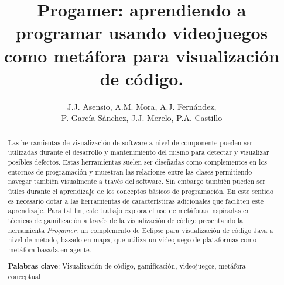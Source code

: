 \documentclass{llncs}
\begin{document}

\title{Progamer: aprendiendo a programar usando videojuegos como metáfora para visualización de código.}


\author{J.J. Asensio, A.M. Mora, A.J. Fernández, \\P. García-Sánchez, J.J. Merelo, P.A. Castillo}

\maketitle
%
%
\begin{abstract} 
Las herramientas de visualización de software a nivel de componente
pueden ser utilizadas durante el desarrollo y mantenimiento del mismo
para detectar y visualizar posibles defectos. Estas herramientas
suelen ser diseñadas como complementos en los entornos de programación y
muestran las relaciones entre las clases permitiendo navegar también
visualmente a través del software. Sin embargo también pueden ser
útiles durante el aprendizaje de los conceptos básicos de
programación. En este sentido es necesario dotar a las herramientas de
características adicionales que faciliten este aprendizaje. Para tal
fin, este trabajo explora el uso de metáforas inspiradas en técnicas de gamificación a través de la visualización de código presentando la herramienta \emph{Progamer}: un
complemento de Eclipse para visualización de código Java a nivel de método,
basado en mapa, que utiliza un videojuego de plataformas como metáfora basada en agente.

\textbf{Palabras clave}: Visualización de código, gamificación, videojuegos, metáfora conceptual
\end{abstract}
\end{document}
